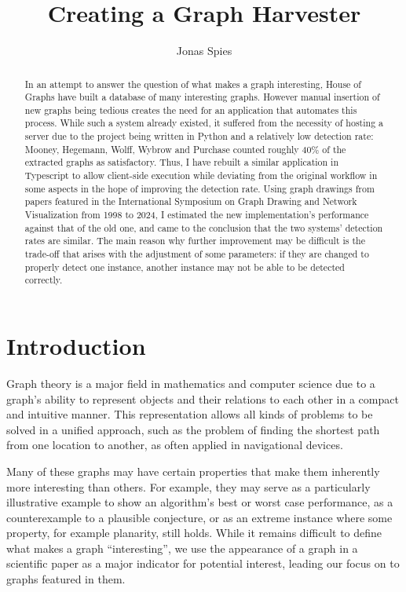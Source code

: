 \documentclass[practical,english]{info1thesis}
\title{Creating a Graph Harvester} %
\author{Jonas Spies} %
\begin{document}
\tableofcontents
\newpage
\begin{abstract}
In an attempt to answer the question of what makes a graph interesting, House of Graphs have built a database of many interesting graphs.
However manual insertion of new graphs being tedious creates the need for an application that automates this process.
While such a system already existed, it suffered from the necessity of hosting a server due to the project being written in Python and a relatively low detection rate:
Mooney, Hegemann, Wolff, Wybrow and Purchase counted roughly 40\% of the extracted graphs as satisfactory.
Thus, I have rebuilt a similar application in Typescript to allow client-side execution while deviating from the original workflow in some aspects in the hope of improving the detection rate.
Using graph drawings from papers featured in the International Symposium on Graph Drawing and Network Visualization from 1998 to 2024, I estimated the new implementation's performance against that of the old one, and came to the conclusion that the two systems' detection rates are similar.
The main reason why further improvement may be difficult is the trade-off that arises with the adjustment of some parameters: if they are changed to properly detect one instance, another instance may not be able to be detected correctly.    
\end{abstract}
\newpage

\section{Introduction}
Graph theory is a major field in mathematics and computer science due to a graph's ability to represent objects and their relations to each other in a compact and intuitive manner.
This representation allows all kinds of problems to be solved in a unified approach, such as the problem of finding the shortest path from one location to another, as often applied in navigational devices.


Many of these graphs may have certain properties that make them inherently more interesting than others. 
For example, they may serve as a particularly illustrative example to show an algorithm's best or worst case performance, as a counterexample to a plausible conjecture, or as an extreme instance where some property, for example planarity, still holds.
While it remains difficult to define what makes a graph ``interesting'', we use the appearance of a graph in a scientific paper as a major indicator for potential interest, leading our focus on to graphs featured in them.
\end{document}
